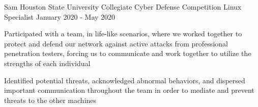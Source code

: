 \begin{cventries}
	\cventry
	  {Sam Houston State University} %
	  {Collegiate Cyber Defense Competition} %
	  {Linux Specialist} %
      {January 2020 - May 2020} %
	  {
	    \begin{cvitems} %
			\item {Participated with a team, in life-like scenarios, where we worked together to protect and defend our network against active attacks from professional penetration testers, forcing us to communicate and work together to utilize the strengths of each individual}
			\item {Identified potential threats, acknowledged abnormal behaviors, and dispersed important communication throughout the team in order to mediate and prevent threats to the other machines}
		\end{cvitems}
	  }


\end{cventries}
